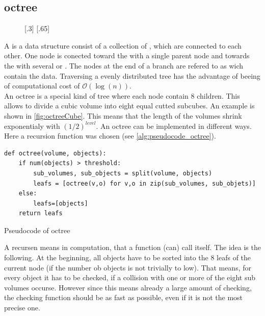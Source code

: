 \subsection{octree}
% 
\begin{figure}[!t]
    \centering
    [.3\textwidth]{
    \def\tikzheight{0.6\textwidth}
    }
    [.65\textwidth]{
    \def\tikzheight{0.6\textwidth}
    }
	\caption{}
	\label{fig:octree}
\end{figure}
% 
A  is a data structure consist of a collection of , which are connected to each other.
One node is conected toward the  with a single parent node and towards the  with several  or .
The nodes at the end of a branch are refered to as  wich contain the data.
Traversing a evenly distributed tree has the advantage of beeing of computational cost of $\mathcal{O}(\log(n))$.
\\
% 
An octree is a special kind of tree where each node contain 8 children.
This allows to divide \ie a cubic volume into eight equal cutted subcubes.
An example is shown in \cref{fig:octreeCube}.
This means that the length of the volumes shrink exponentialy with $(1/2)^\mathit{level}$.
% 
An octree can be implemented in different ways.
Here a recursion function was chosen (see \cref{alg:pseudocode_octree}).
% 
\begin{lstfloat}[!tb]
\lstset{style=python}
\begin{lstlisting}[]
def octree(volume, objects):
    if num(objects) > threshold:
        sub_volumes, sub_objects = split(volume, objects)
        leafs = [octree(v,o) for v,o in zip(sub_volumes, sub_objets)]
    else:
        leafs=[objects]
    return leafs
\end{lstlisting}
\caption{Pseudocode of octree}
\label{alg:pseudocode_octree}
\end{lstfloat}
% 
A recursen means in computation, that a function (can) call itself.
The idea is the following.
At the beginning, all objects have to be sorted into the 8 leafs of the current node (if the number ob objects is not trivially to low).
That means, for every object it has to be checked, if a collision with one or more of the eight sub volumes occurse.
However since this means already a large amount of checking, the checking function should be as fast as possible, even if it is not the most precise one.
